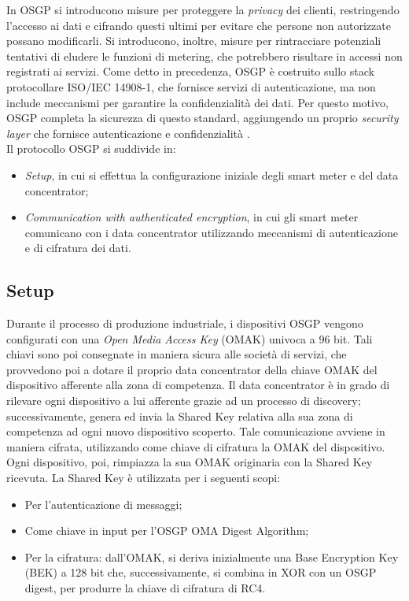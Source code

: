 In OSGP si introducono misure per proteggere la \textit{privacy} dei clienti, restringendo l'accesso ai dati e cifrando questi ultimi per evitare che persone non autorizzate possano modificarli. Si introducono, inoltre, misure per rintracciare potenziali tentativi di eludere le funzioni di metering, che potrebbero risultare in accessi non registrati ai servizi. \newline Come detto in precedenza, OSGP è costruito sullo stack protocollare ISO/IEC 14908-1, che fornisce servizi di autenticazione, ma non include meccanismi per garantire la confidenzialità dei dati. Per questo motivo, OSGP completa la sicurezza di questo standard, aggiungendo un proprio \textit{security layer} che fornisce autenticazione e confidenzialità \cite{osgpsec}.\\
Il protocollo OSGP si suddivide in:
\begin{itemize}
\item \textit{Setup}, in cui si effettua la configurazione iniziale degli smart meter e del data concentrator;
\item \textit{Communication with authenticated encryption}, in cui gli smart meter comunicano con i data concentrator utilizzando meccanismi di autenticazione e di cifratura dei dati.
\end{itemize}

\subsection{Setup}
Durante il processo di produzione industriale, i dispositivi OSGP vengono configurati con una \textit{Open Media Access Key} (OMAK) univoca a 96 bit. Tali chiavi sono poi consegnate in maniera sicura alle società di servizi, che provvedono poi a dotare il proprio data concentrator della chiave OMAK del dispositivo afferente alla zona di competenza. \newline Il data concentrator è in grado di rilevare ogni dispositivo a lui afferente grazie ad un processo di discovery; successivamente, genera ed invia la Shared Key relativa alla sua zona di competenza ad ogni nuovo dispositivo scoperto. Tale comunicazione avviene in maniera cifrata, utilizzando come chiave di cifratura la OMAK del dispositivo. Ogni dispositivo, poi, rimpiazza la sua OMAK originaria con la Shared Key ricevuta. \newline La Shared Key è utilizzata per i seguenti scopi:
\begin{itemize}
\item Per l'autenticazione di messaggi;
\item Come chiave in input per l'OSGP OMA Digest Algorithm;
\item Per la cifratura: dall'OMAK, si deriva inizialmente una Base Encryption Key (BEK) a 128 bit che, successivamente, si combina in XOR con un OSGP digest, per produrre la chiave di cifratura di RC4.
\end{itemize}

